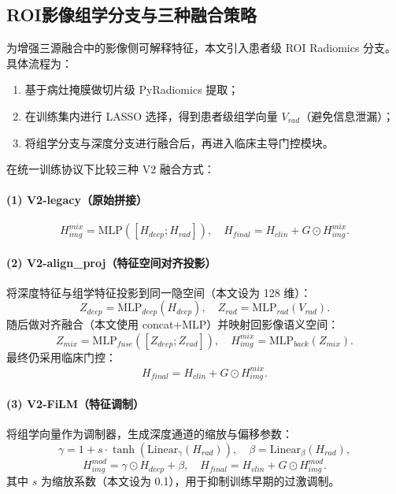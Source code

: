 \documentclass[12pt,a4paper]{ctexart}
\begin{document}
\subsection{ROI影像组学分支与三种融合策略}
为增强三源融合中的影像侧可解释特征，本文引入患者级 ROI Radiomics 分支。具体流程为：
\begin{enumerate}
  \item 基于病灶掩膜做切片级 PyRadiomics 提取；
  \item 在训练集内进行 LASSO 选择，得到患者级组学向量 $V_{rad}$（避免信息泄漏）；
  \item 将组学分支与深度分支进行融合后，再进入临床主导门控模块。
\end{enumerate}

在统一训练协议下比较三种 V2 融合方式：
\paragraph{(1) V2-legacy（原始拼接）}
\begin{equation}
H_{img}^{mix}=\mathrm{MLP}([H_{deep};H_{rad}]), \quad
H_{final}=H_{clin}+G\odot H_{img}^{mix}.
\end{equation}

\paragraph{(2) V2-align\_proj（特征空间对齐投影）}
将深度特征与组学特征投影到同一隐空间（本文设为 128 维）：
\begin{equation}
Z_{deep}=\mathrm{MLP}_{deep}(H_{deep}),\quad
Z_{rad}=\mathrm{MLP}_{rad}(V_{rad}).
\end{equation}
随后做对齐融合（本文使用 concat+MLP）并映射回影像语义空间：
\begin{equation}
Z_{mix}=\mathrm{MLP}_{fuse}([Z_{deep};Z_{rad}]),\quad
H_{img}^{mix}=\mathrm{MLP}_{back}(Z_{mix}).
\end{equation}
最终仍采用临床门控：
\begin{equation}
H_{final}=H_{clin}+G\odot H_{img}^{mix}.
\end{equation}

\paragraph{(3) V2-FiLM（特征调制）}
将组学向量作为调制器，生成深度通道的缩放与偏移参数：
\begin{equation}
\gamma = 1 + s\cdot\tanh(\mathrm{Linear}_{\gamma}(H_{rad})),\quad
\beta = \mathrm{Linear}_{\beta}(H_{rad}),
\end{equation}
\begin{equation}
H_{img}^{mod}=\gamma\odot H_{deep}+\beta,\quad
H_{final}=H_{clin}+G\odot H_{img}^{mod}.
\end{equation}
其中 $s$ 为缩放系数（本文设为 0.1），用于抑制训练早期的过激调制。
\end{document}
